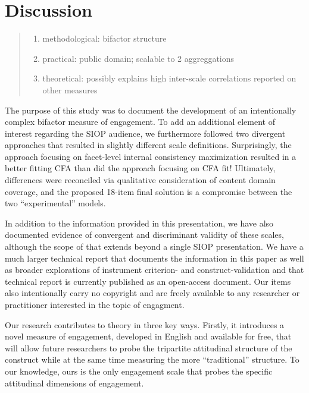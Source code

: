 \documentclass[
  english,
  man]{apa7}
\providecommand{\tightlist}{%
  \setlength{\itemsep}{0pt}\setlength{\parskip}{0pt}}
\begin{document}
\hypertarget{discussion}{%
\section{Discussion}\label{discussion}}

\begin{quote}
\begin{enumerate}
\def\labelenumi{\arabic{enumi})}
\tightlist
\item
  methodological: bifactor structure
\item
  practical: public domain; scalable to 2 aggreggations
\item
  theoretical: possibly explains high inter-scale correlations reported on other measures
\end{enumerate}
\end{quote}

The purpose of this study was to document the development of an intentionally complex bifactor measure of engagement. To add an additional element of interest regarding the SIOP audience, we furthermore followed two divergent approaches that resulted in slightly different scale definitions. Surprisingly, the approach focusing on facet-level internal consistency maximization resulted in a better fitting CFA than did the approach focusing on CFA fit! Ultimately, differences were reconciled via qualitative consideration of content domain coverage, and the proposed 18-item final solution is a compromise between the two ``experimental'' models.

In addition to the information provided in this presentation, we have also documented evidence of convergent and discriminant validity of these scales, although the scope of that extends beyond a single SIOP presentation. We have a much larger technical report that documents the information in this paper as well as broader explorations of instrument criterion- and construct-validation and that technical report is currently published as an open-access document. Our items also intentionally carry no copyright and are freely available to any researcher or practitioner interested in the topic of engagment.

Our research contributes to theory in three key ways. Firstly, it introduces a novel measure of engagement, developed in English and available for free, that will allow future researchers to probe the tripartite attitudinal structure of the construct while at the same time measuring the more ``traditional'' structure. To our knowledge, ours is the only engagement scale that probes the specific attitudinal dimensions of engagement.
\end{document}
